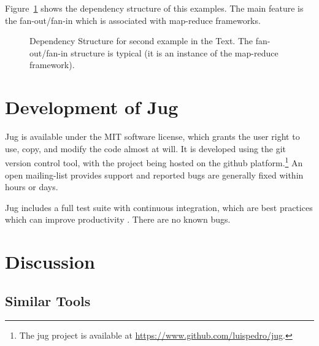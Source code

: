 \documentclass{article}
\begin{document}
Figure~\ref{fig:jug-deps-complex} shows the dependency structure of this
examples. The main feature is the fan-out/fan-in which is associated with
map-reduce frameworks.

\begin{figure}
\begin{center}

\end{center}
\caption{Dependency Structure for second example in the Text. The
fan-out/fan-in structure is typical (it is an instance of the map-reduce
framework).}
\label{fig:jug-deps-complex}
\end{figure}

\section{Development of Jug}
Jug is available under the MIT software license, which grants the user right to
use, copy, and modify the code almost at will. It is developed using the git
version control tool, with the project being hosted on the github
platform.\footnote{The jug project is available at
\url{https://www.github.com/luispedro/jug}.} An open mailing-list provides
support and reported bugs are generally fixed within hours or days.

Jug includes a full test suite with continuous integration, which are best
practices \citep{wilson2014best} which can improve productivity
\citep{vasilescu2015quality}. There are no known bugs.

\section{Discussion}

\subsection{Similar Tools}
\end{document}
